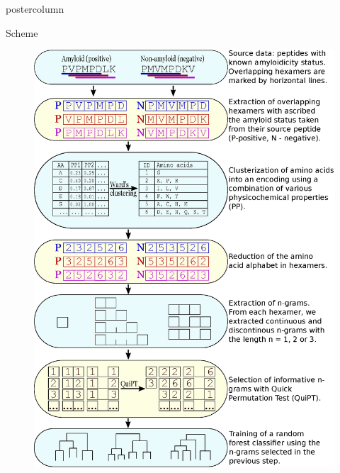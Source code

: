\documentclass[final]{beamer}\usepackage[]{graphicx}\usepackage[]{color}
\begin{document}
\begin{frame}
\begin{columns}
\begin{column}{.53\textwidth}
\begin{beamercolorbox}[center,wd=\textwidth]{postercolumn}
\begin{minipage}[T]{.95\textwidth}
{\begin{block}{Scheme}
\begin{figure} 
\includegraphics[width=0.85\columnwidth]{static_figure/ngram_scheme_poster.eps}
\end{figure}

    \end{block}


}
\end{minipage}
\end{beamercolorbox}
\end{column}
\end{columns}
\end{frame}
\end{document}
